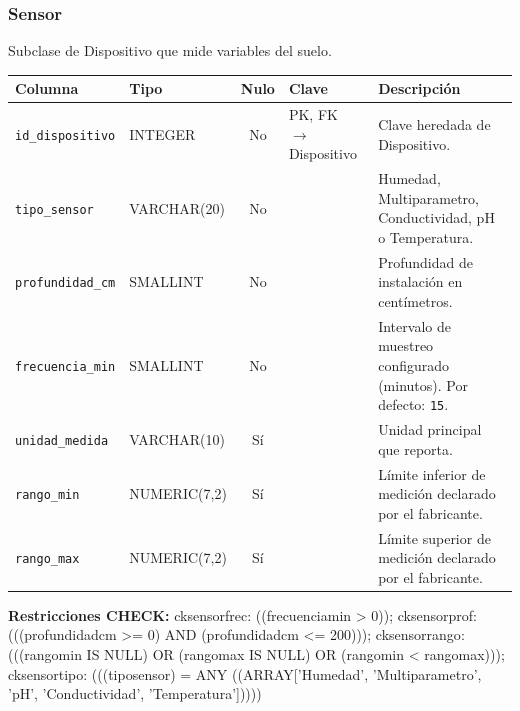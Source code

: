 \documentclass[11pt,letterpaper]{article}
\newcommand{\tbus}{\textunderscore\allowbreak}
\newcommand{\tb}[1]{{\ttfamily\let\_\tbus #1}}
\begin{document}
\subsubsection*{Sensor}
Subclase de Dispositivo que mide variables del suelo.
{\footnotesize
\begin{longtable}{>{\raggedright\arraybackslash}p{3.3cm}>{\raggedright\arraybackslash}p{2.5cm}c>{\raggedright\arraybackslash}p{2.2cm}>{\raggedright\arraybackslash}p{6.1cm}}
\toprule
\textbf{Columna} & \textbf{Tipo} & \textbf{Nulo} & \textbf{Clave} & \textbf{Descripción} \\
\midrule
\endhead
\texttt{id\_dispositivo} & INTEGER & No & PK, FK $\to$ Dispositivo & Clave heredada de Dispositivo. \\
\texttt{tipo\_sensor} & VARCHAR(20) & No &  & Humedad, Multiparametro, Conductividad, pH o Temperatura. \\
\texttt{profundidad\_cm} & SMALLINT & No &  & Profundidad de instalación en centímetros. \\
\texttt{frecuencia\_min} & SMALLINT & No &  & Intervalo de muestreo configurado (minutos). Por defecto: \texttt{15}. \\
\texttt{unidad\_medida} & VARCHAR(10) & Sí &  & Unidad principal que reporta. \\
\texttt{rango\_min} & NUMERIC(7,2) & Sí &  & Límite inferior de medición declarado por el fabricante. \\
\texttt{rango\_max} & NUMERIC(7,2) & Sí &  & Límite superior de medición declarado por el fabricante. \\
\bottomrule
\end{longtable}}
{\footnotesize\textbf{Restricciones CHECK:} \tb{ck\_sensor\_frec}: \tb{((frecuencia\_min > 0))}; \tb{ck\_sensor\_prof}: \tb{(((profundidad\_cm >= 0) AND (profundidad\_cm <= 200)))}; \tb{ck\_sensor\_rango}: \tb{(((rango\_min IS NULL) OR (rango\_max IS NULL) OR (rango\_min < rango\_max)))}; \tb{ck\_sensor\_tipo}: \tb{(((tipo\_sensor) = ANY ((ARRAY['Humedad', 'Multiparametro', 'pH', 'Conductividad', 'Temperatura']))))}\par}
\medskip
\end{document}
